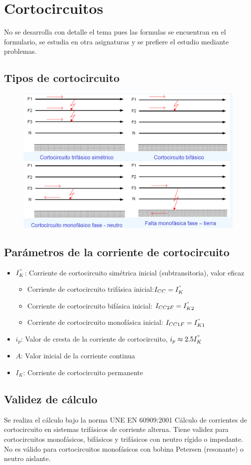 \chapter{Cortocircuitos}
No se desarrolla con detalle el tema pues las formulas se encuentran en el formulario, se estudia en otra asignaturas y se prefiere el estudio mediante problemas.
\section{Tipos de cortocircuito}
\begin{figure}[H]
	\centering
	\includegraphics[width=0.7\linewidth]{Images/11}
	\label{fig:11}
\end{figure}
\section{Parámetros de la corriente de cortocircuito}
\begin{itemize}
	\item $I_K^"$: Corriente de cortocircuito simétrica inicial (subtransitoria), valor eficaz
	\begin{itemize}
		\item Corriente de cortocircuito trifásica inicial:$I_{CC}=I_{K}^"$
		\item Corriente de cortocircuito bifásica inicial: $I_{CC2F}=I_{K2}^"$
		\item Corriente de cortocircuito monofásica inicial: $I_{CC1F}=I_{K1}^"$
	\end{itemize}
	\item $i_p$: Valor de cresta de la corriente de cortocircuito, $i_p\approx 2.5 I_K^"$
	\item $A$: Valor inicial de la corriente continua
	\item $I_K$: Corriente de cortocircuito permanente
\end{itemize}
\section{Validez de cálculo}
Se realiza el cálculo bajo la norma UNE EN 60909:2001 Cálculo de corrientes de cortocircuito en sistemas trifásicos de corriente alterna. Tiene validez para cortocircuitos monofásicos, bifásicos y trifásicos con neutro rígido o impedante. No es válido para cortocircuitos monofásicos con bobina Petersen (resonante) o neutro aislante.
